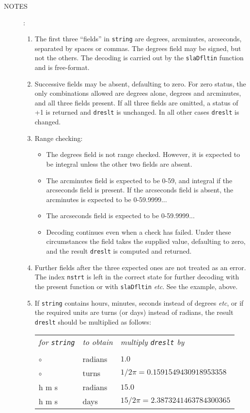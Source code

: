 \documentclass[11pt,fleqn,twoside]{article}
\renewcommand{\_}{{\tt\char'137}}     %
\newlength{\oldspacing}
\newcommand{\notes}[1]
{
  \goodbreak
  \setlength{\oldspacing}{\topsep}
  \setlength{\topsep}{0.3ex}
  \begin{description}
    \item[NOTES]:
        #1
  \end{description}
  \setlength{\topsep}{\oldspacing}
}
\begin{document}
\setlength{\topsep}{\oldspacing}
\notes
{
 \begin{enumerate}
  \item The first three ``fields'' in {\tt string} are degrees, arcminutes,
   arcseconds, separated by spaces or commas.  The degrees field
   may be signed, but not the others.  The decoding is carried
   out by the {\tt slaDfltin} function and is free-format.
  \item Successive fields may be absent, defaulting to zero.  For
   zero status, the only combinations allowed are degrees alone,
   degrees and arcminutes, and all three fields present.  If all
   three fields are omitted, a status of +1 is returned and {\tt dreslt} is
   unchanged.  In all other cases {\tt dreslt} is changed.
  \item Range checking:
   \begin{itemize}
    \item The degrees field is not range checked.  However, it is
     expected to be integral unless the other two fields are absent.
    \item The arcminutes field is expected to be 0-59, and integral if
     the arcseconds field is present.  If the arcseconds field
     is absent, the arcminutes is expected to be 0-59.9999...
    \item The arcseconds field is expected to be 0-59.9999...
    \item Decoding continues even when a check has failed.  Under these
     circumstances the field takes the supplied value, defaulting to
     zero, and the result {\tt dreslt} is computed and returned.
   \end{itemize}
   \item Further fields after the three expected ones are not treated as
    an error.  The index {\tt nstrt} is left in the correct state for
    further decoding with the present function or with {\tt slaDfltin}
    {\it etc}.  See the example, above.
   \item If {\tt string} contains hours, minutes, seconds instead of
    degrees {\it etc},
    or if the required units are turns (or days) instead of radians,
    the result {\tt dreslt} should be multiplied as follows: \\ [1.5ex]
    \begin{tabular}{p{6em}p{5em}p{18em}}
    {\it for {\tt string}} & {\it to obtain} &
                             {\it multiply {\tt dreslt} by} \\ \\
    ${\circ}$~~\raisebox{-0.7ex}{$'$}~~\raisebox{-0.7ex}{$''$}
     & radians & $1.0$ \\
    ${\circ}$~~\raisebox{-0.7ex}{$'$}~~\raisebox{-0.7ex}{$''$}
     & turns & $1/{2 \pi} = 0.1591549430918953358$ \\
    h m s & radians & $15.0$ \\
    h m s & days & $15/{2\pi} = 2.3873241463784300365$
   \end{tabular}
 \end{enumerate}
}
\end{document}
